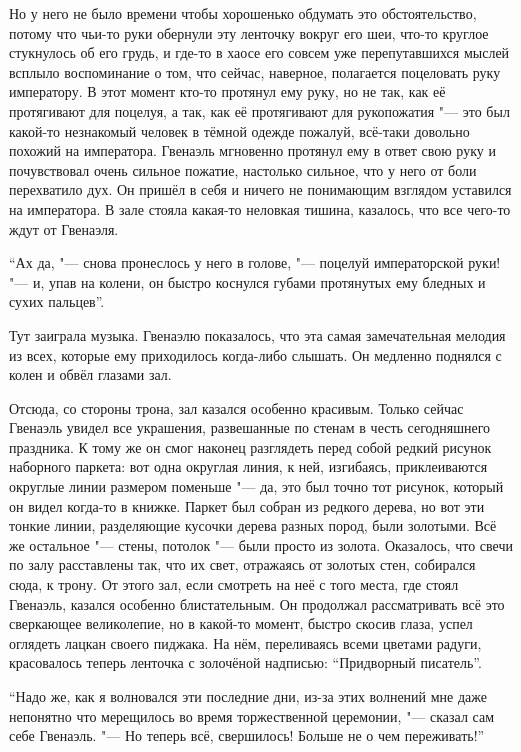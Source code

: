 Но у него не было времени чтобы хорошенько обдумать это обстоятельство, потому
что чьи-то руки обернули эту ленточку вокруг его шеи, что-то круглое стукнулось
об его грудь, и где-то в хаосе его совсем уже перепутавшихся мыслей всплыло
воспоминание о том, что сейчас, наверное, полагается поцеловать руку императору.
В этот момент кто-то протянул ему руку, но не так, как её протягивают для
поцелуя, а так, как её протягивают для рукопожатия "--- это был какой-то
незнакомый человек в тёмной одежде пожалуй, всё-таки довольно похожий на
императора.
Гвенаэль мгновенно протянул ему в ответ свою руку и почувствовал очень сильное
пожатие, настолько сильное, что у него от боли перехватило дух.
Он пришёл в себя и ничего не понимающим взглядом уставился на императора.
В зале стояла какая-то неловкая тишина, казалось, что все чего-то ждут от
Гвенаэля.

\enquote{Ах да, "--- снова пронеслось у него в голове, "--- поцелуй императорской
руки! "--- и, упав на колени, он быстро коснулся губами протянутых ему бледных
и сухих пальцев}.

Тут заиграла музыка.
Гвенаэлю показалось, что эта самая замечательная мелодия из всех, которые ему
приходилось когда-либо слышать.
Он медленно поднялся с колен и обвёл глазами зал.

Отсюда, со стороны трона, зал казался особенно красивым.
Только сейчас Гвенаэль увидел все украшения, развешанные по стенам в честь
сегодняшнего праздника.
К тому же он смог наконец разглядеть перед собой редкий рисунок наборного
паркета: вот одна округлая линия, к ней, изгибаясь, приклеиваются округлые линии
размером поменьше "--- да, это был точно тот рисунок, который он видел когда-то
в книжке.
Паркет был собран из редкого дерева, но вот эти тонкие линии, разделяющие
кусочки дерева разных пород, были золотыми.
Всё же остальное "--- стены, потолок "--- были просто из золота.
Оказалось, что свечи по залу расставлены так, что их свет, отражаясь от золотых
стен, собирался сюда, к трону.
От этого зал, если смотреть на неё с того места, где стоял Гвенаэль, казался
особенно блистательным.
Он продолжал рассматривать всё это сверкающее великолепие, но в какой-то момент,
быстро скосив глаза, успел оглядеть лацкан своего пиджака.
На нём, переливаясь всеми цветами радуги, красовалось теперь ленточка с
золочёной надписью: \enquote{Придворный писатель}.

\enquote{Надо же, как я волновался эти последние дни, из-за этих волнений мне
даже непонятно что мерещилось во время торжественной церемонии, "--- сказал сам
себе Гвенаэль.
"--- Но теперь всё, свершилось!
Больше не о чем переживать!}

